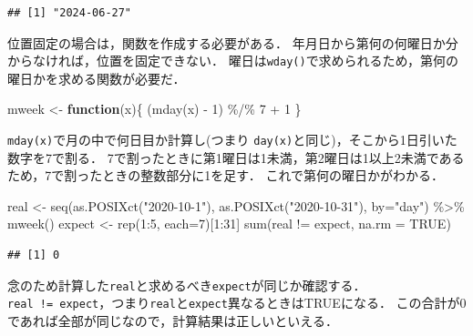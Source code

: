 \documentclass[
]{article}
\newenvironment{Shaded}{\begin{snugshade}}{\end{snugshade}}
\newcommand{\AttributeTok}[1]{\textcolor[rgb]{0.77,0.63,0.00}{#1}}
\newcommand{\ConstantTok}[1]{\textcolor[rgb]{0.00,0.00,0.00}{#1}}
\newcommand{\ControlFlowTok}[1]{\textcolor[rgb]{0.13,0.29,0.53}{\textbf{#1}}}
\newcommand{\DecValTok}[1]{\textcolor[rgb]{0.00,0.00,0.81}{#1}}
\newcommand{\FunctionTok}[1]{\textcolor[rgb]{0.00,0.00,0.00}{#1}}
\newcommand{\NormalTok}[1]{#1}
\newcommand{\OtherTok}[1]{\textcolor[rgb]{0.56,0.35,0.01}{#1}}
\newcommand{\SpecialCharTok}[1]{\textcolor[rgb]{0.00,0.00,0.00}{#1}}
\newcommand{\StringTok}[1]{\textcolor[rgb]{0.31,0.60,0.02}{#1}}
\begin{document}
\begin{verbatim}
## [1] "2024-06-27"
\end{verbatim}

位置固定の場合は，関数を作成する必要がある．
年月日から第何の何曜日か分からなければ，位置を固定できない．
曜日は\texttt{wday()}で求められるため，第何の曜日かを求める関数が必要だ．

\begin{Shaded}
\begin{Highlighting}[]
\NormalTok{mweek }\OtherTok{\textless{}{-}} \ControlFlowTok{function}\NormalTok{(x)\{}
\NormalTok{  (}\FunctionTok{mday}\NormalTok{(x) }\SpecialCharTok{{-}} \DecValTok{1}\NormalTok{) }\SpecialCharTok{\%/\%} \DecValTok{7} \SpecialCharTok{+} \DecValTok{1}
\NormalTok{\}}
\end{Highlighting}
\end{Shaded}

\texttt{mday(x)}で月の中で何日目か計算し(つまり \texttt{day(x)}と同じ)，そこから1日引いた数字を7で割る．
7で割ったときに第1曜日は1未満，第2曜日は1以上2未満であるため，7で割ったときの整数部分に1を足す．
これで第何の曜日かがわかる．

\begin{Shaded}
\begin{Highlighting}[]
\NormalTok{real    }\OtherTok{\textless{}{-}} \FunctionTok{seq}\NormalTok{(}\FunctionTok{as.POSIXct}\NormalTok{(}\StringTok{"2020{-}10{-}1"}\NormalTok{), }\FunctionTok{as.POSIXct}\NormalTok{(}\StringTok{"2020{-}10{-}31"}\NormalTok{), }\AttributeTok{by=}\StringTok{"day"}\NormalTok{) }\SpecialCharTok{\%\textgreater{}\%} \FunctionTok{mweek}\NormalTok{()}
\NormalTok{expect }\OtherTok{\textless{}{-}} \FunctionTok{rep}\NormalTok{(}\DecValTok{1}\SpecialCharTok{:}\DecValTok{5}\NormalTok{, }\AttributeTok{each=}\DecValTok{7}\NormalTok{)[}\DecValTok{1}\SpecialCharTok{:}\DecValTok{31}\NormalTok{]}
\FunctionTok{sum}\NormalTok{(real }\SpecialCharTok{!=}\NormalTok{ expect, }\AttributeTok{na.rm =} \ConstantTok{TRUE}\NormalTok{)}
\end{Highlighting}
\end{Shaded}

\begin{verbatim}
## [1] 0
\end{verbatim}

念のため計算した\texttt{real}と求めるべき\texttt{expect}が同じか確認する．
\texttt{real\ !=\ expect}，つまり\texttt{real}と\texttt{expect}異なるときはTRUEになる．
この合計が0であれば全部が同じなので，計算結果は正しいといえる．
\end{document}
